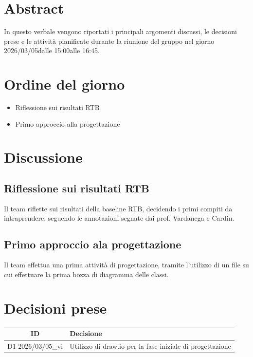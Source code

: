 \documentclass[a4paper,12pt]{article}
\newcommand{\DataVerbale}{2026/03/05}
\newcommand{\OraInizio}{15:00}
\newcommand{\OraFine}{16:45}
\newcommand{\AbstractVerbale}{%
In questo verbale vengono riportati i principali argomenti discussi, le decisioni prese e le attività pianificate durante la riunione del gruppo nel giorno \DataVerbale \space dalle \OraInizio \space alle \OraFine.
}
\begin{document}
\newpage

\tableofcontents

\newpage
\section{Abstract}{
    \begin{minipage}{0.9\textwidth}
        \small
        \AbstractVerbale
    \end{minipage}
}


\section{Ordine del giorno}{
    \begin{itemize}
        \item Riflessione sui risultati RTB
        \item Primo approccio alla progettazione
    \end{itemize}
}


\section{Discussione}{
    \subsection{Riflessione sui risultati RTB}
    Il team riflette sui risultati della baseline RTB, decidendo i primi compiti da intraprendere, seguendo le annotazioni segnate dai prof. Vardanega e Cardin. 
    \subsection{Primo approccio ala progettazione}
    Il team effettua una prima attività di progettazione, tramite l'utilizzo di un file su cui effettuare la prima bozza di diagramma delle classi. 
}

\section{Decisioni prese}{
    \begin{center}
    \begin{tabular}{|c|p{12cm}|}
        \hline
        \textbf{ID} & \textbf{Decisione} \\
        \hline
            D1-\DataVerbale\_vi & Utilizzo di draw.io per la fase iniziale di progettazione\\
        \hline
    \end{tabular}
    \end{center}
}
\end{document}
